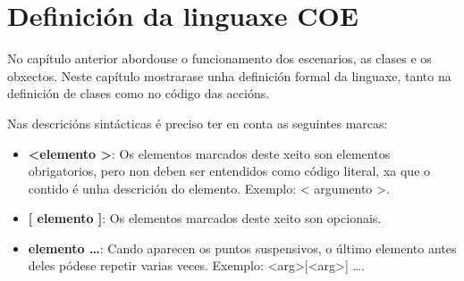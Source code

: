 \section{Definición da linguaxe COE}
\label{ch:definicion}
No capítulo anterior abordouse o funcionamento dos escenarios, as clases e os
obxectos. Neste capítulo mostrarase unha definición formal da linguaxe, tanto na
definición de clases como no código das accións.
\par
Nas descricións sintácticas é preciso ter en conta as seguintes marcas:
\begin{itemize}
  \item {\bf \textless elemento \textgreater}: Os elementos marcados deste
  xeito son elementos obrigatorios, pero non deben ser entendidos como código
  literal, xa que o contido é unha descrición do elemento. Exemplo: \textless
  argumento \textgreater.
  \item {\bf [ elemento ]}: Os elementos marcados deste xeito son opcionais.
  \item {\bf elemento \ldots}: Cando aparecen os puntos suspensivos, o último
  elemento antes deles pódese repetir varias veces.
  Exemplo:
  \textless arg\textgreater {}[\textless arg\textgreater] \ldots.
\end{itemize}

